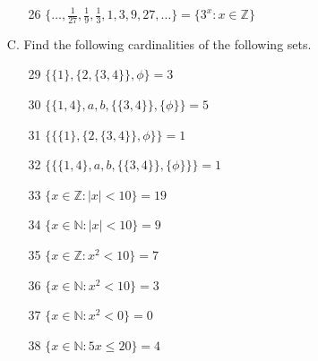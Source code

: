 \documentclass[12pt]{article}
\begin{document}
\begin{itemize}
\begin{enumerate}
	    \item[26] $\{\ldots, \frac{1}{27} ,\frac{1}{9},\frac{1}{3},1,3,9,27, \ldots\} = \{3^x:x \in \mathbb{Z}\}$
	\end{enumerate}
    \item[C.] Find the following cardinalities of the following sets.
	\begin{multicols}{2}
	\begin{enumerate}
	    \item[29] $\{\{1\}, \{2, \{3, 4\}\}, \phi\} = 3$
	    \item[30] $\{\{1,4\}, a, b, \{\{3, 4\}\}, \{\phi\}\} = 5$
	    \item[31] $\{\{\{1\}, \{2, \{3,4\}\}, \phi\}\} = 1$
	    \item[32] $\{\{\{1,4\}, a,b, \{\{3,4\}\}, \{\phi\}\}\} = 1$
	    \item[33] $\{x \in \mathbb{Z} : |x| < 10\} = 19$
	    \item[34] $\{x \in \mathbb{N} : |x| < 10\} = 9$
	    \item[35] $\{x \in \mathbb{Z} : x^2 < 10\} = 7$
	    \item[36] $\{x \in \mathbb{N} : x^2 < 10\} = 3$
	    \item[37] $\{x \in \mathbb{N} : x^2 < 0\} = 0$
	    \item[38] $\{x \in \mathbb{N} : 5x \le 20\} = 4$
	\end{enumerate}
	\end{multicols}
\end{itemize}
\end{document}
